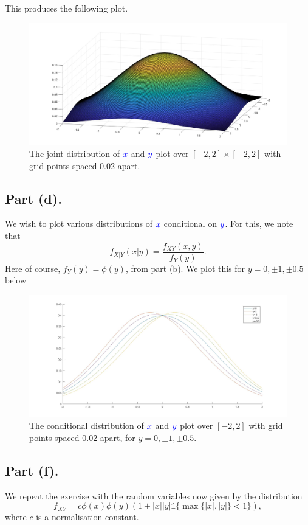 \documentclass{article}
\renewcommand{\r}[1]{\textcolor{blue}{#1}}
\begin{document}
This produces the following plot.
\begin{figure}[h]
\centering
\includegraphics[width=13cm]{q8partc.jpeg}
\caption{The joint distribution of $\r{x}$ and $\r{y}$ plot over $[-2,2]\times[-2,2]$ with grid points spaced 0.02 apart.}
\label{fig:8c}
\end{figure} 

\subsection{Part (d).}
We wish to plot various distributions of $\r{x}$ conditional on $\r{y}$. For this, we note that
\begin{equation} f_{X|Y}(x|y)=\frac{f_{XY}(x,y)}{f_{Y}(y)}.\end{equation}
Here of course, $f_{Y}(y) = \phi(y)$, from part (b). We plot this for $y=0,\pm1,\pm0.5$ below

\begin{figure}[h]
\centering
\includegraphics[width=13cm]{q8partd.jpeg}
\caption{The conditional distribution of $\r{x}$ and $\r{y}$ plot over $[-2,2]$ with grid points spaced 0.02 apart, for $y=0,\pm1,\pm0.5$.}
\label{fig:8d}
\end{figure} 

\subsection{Part (f).}
We repeat the exercise with the random variables now given by the distribution
\begin{equation} f_{XY}=c\phi(x)\phi(y)(1+|x||y|\mathds{1}\{\max\{|x|,|y|\}<1\}),\end{equation}
where $c$ is a normalisation constant.
\end{document}
